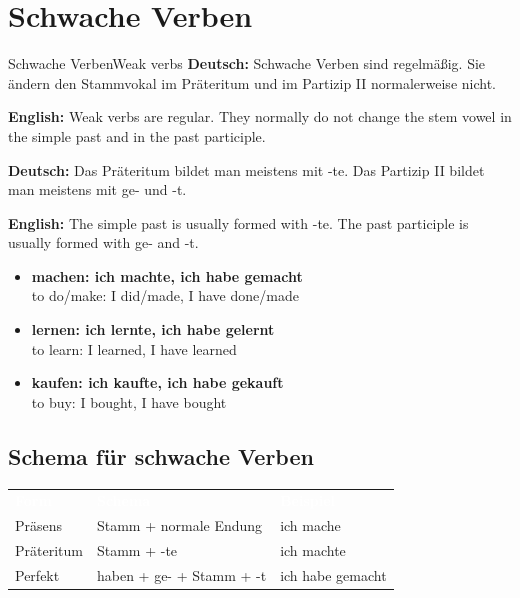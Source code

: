 \documentclass[a4paper,11pt]{article}
\newcommand{\GermanText}[1]{\textbf{Deutsch: }#1\par}
\newcommand{\EnglishText}[1]{{\small\color{SoftGray}\textbf{English: }#1\par}}
\newcommand{\ExampleItem}[2]{\item \textbf{#1}\\{\small\color{SoftGray}#2}}
\begin{document}
    
    \section{Schwache Verben}
        
        \begin{grammarentry}{Schwache Verben}{Weak verbs}
            \GermanText{Schwache Verben sind regelmäßig. Sie ändern den Stammvokal im Präteritum und im Partizip II normalerweise nicht.}
            \EnglishText{Weak verbs are regular. They normally do not change the stem vowel in the simple past and in the past participle.}
            
            \GermanText{Das Präteritum bildet man meistens mit -te. Das Partizip II bildet man meistens mit ge- und -t.}
            \EnglishText{The simple past is usually formed with -te. The past participle is usually formed with ge- and -t.}
            
            \begin{exbox}
                \begin{itemize}
                    \ExampleItem{machen: ich machte, ich habe gemacht}{to do/make: I did/made, I have done/made}
                    \ExampleItem{lernen: ich lernte, ich habe gelernt}{to learn: I learned, I have learned}
                    \ExampleItem{kaufen: ich kaufte, ich habe gekauft}{to buy: I bought, I have bought}
                \end{itemize}
            \end{exbox}
        \end{grammarentry}
        
        \subsection{Schema für schwache Verben}
            
            \begin{tabular}{>{\raggedright\arraybackslash}p{4cm} >{\raggedright\arraybackslash}p{5cm} >{\raggedright\arraybackslash}p{5cm}}
                \rowcolor{HeaderBlueDark}
                \textcolor{white}{\textbf{Form}} &
                \textcolor{white}{\textbf{Schema}} &
                \textcolor{white}{\textbf{Beispiel}} \\
                
                \rowcolor{RowBlueLight}
                Präsens &
                Stamm + normale Endung &
                ich mache \\
                
                \rowcolor{RowBlueDark}
                Präteritum &
                Stamm + -te &
                ich machte \\
                
                \rowcolor{RowBlueLight}
                Perfekt &
                haben + ge- + Stamm + -t &
                ich habe gemacht \\
            \end{tabular}
    
\end{document}
